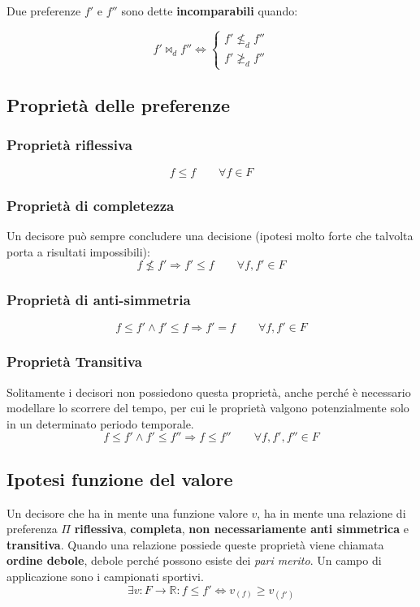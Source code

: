 \documentclass[\main/main.tex]{subfiles}
\begin{document}
\begin{definition}[Incomparabilità]
Due preferenze $f'$ e $f''$ sono dette \textbf{incomparabili} quando:

\[
	f' \Join_d f'' \Leftrightarrow \begin{cases} f' \nleq_d f'' \\ f' \ngeq_d f'' \end{cases}
\] 
\end{definition}


\subsection{Proprietà delle preferenze}
\subsubsection{Proprietà riflessiva}
\[
	f \leq f \qquad \forall f \in F
\]

\subsubsection{Proprietà di completezza}
Un decisore può sempre concludere una decisione (ipotesi molto forte che talvolta porta a risultati impossibili):
\[
	f \nleq f' \Rightarrow f' \leq f \qquad \forall f, f' \in F
\]

\subsubsection{Proprietà di anti-simmetria}
\[
	f \leq f' \wedge f' \leq f \Rightarrow f' = f \qquad \forall f, f' \in F
\]

\subsubsection{Proprietà Transitiva}
Solitamente i decisori non possiedono questa proprietà, anche perché è necessario modellare lo scorrere del tempo, per cui le proprietà valgono potenzialmente solo in un determinato periodo temporale.
\[
	f \leq f' \wedge f' \leq f'' \Rightarrow f \leq f'' \qquad \forall f, f', f'' \in F
\]

\subsection{Ipotesi funzione del valore}
Un decisore che ha in mente una funzione valore $v$, ha in mente una relazione di preferenza $\Pi$ \textbf{riflessiva}, \textbf{completa}, \textbf{non necessariamente anti simmetrica} e \textbf{transitiva}. Quando una relazione possiede queste proprietà viene chiamata \textbf{ordine debole}, debole perché possono esiste dei \textit{pari merito}. Un campo di applicazione sono i campionati sportivi.
\[
	\exists v: F\rightarrow \mathbb{R}: f \leq f' \Leftrightarrow v_{(f)} \geq v_{(f')}
\]
\end{document}
